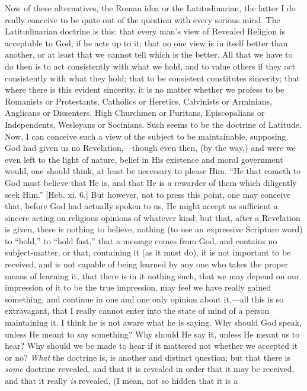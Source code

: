 Now of these alternatives, the Roman idea or the Latitudinarian,
the latter I do really conceive to be quite out of the question with
every serious mind. The Latitudinarian doctrine is this: that every
man's view of Revealed Religion is acceptable to God, if he acts up to
it; that no one view is in itself better than another, or at least
that we cannot tell which is the better. All that we have to do then
is to act consistently with what we hold, and to value others if they
act consistently with what they hold; that to be consistent
constitutes sincerity; that where there is this evident sincerity, it
is no matter whether we profess to be Romanists or Protestants,
Catholics or Heretics, Calvinists or Arminians, Anglicans or
Dissenters, High Churchmen or Puritans, Episcopalians or Independents,
Wesleyans or Socinians. Such seems to be the doctrine of Latitude.
Now, I can conceive such a view of the subject to be maintainable,
supposing God had given us no Revelation,—though even then, (by the
way,) and were we even left to the light of nature, belief in His
existence and moral government would, one should think, at least be
necessary to please Him. ``He that cometh to God must believe that
He is, and that He is a rewarder of them which diligently seek
Him.'' [Heb. xi. 6.] But however, not to press this point, one may
conceive that, before God had actually spoken to us, He might accept
as sufficient a sincere acting on religious opinions of whatever kind;
but that, after a Revelation is given, there is nothing to believe,
nothing (to use an expressive Scripture word) to ``hold,'' to
``hold fast,'' that a message comes from God, and contains no
subject-matter, or that, containing it (as it must do), it is not
important to be received, and is not capable of being learned by any
one who takes the proper means of learning it, that there is in it
nothing such, that we may depend on our impression of it to be the
true impression, may feel we have really gained something, and
continue in one and one only opinion about it,—all this is so
extravagant, that I really cannot enter into the state of mind of a
person maintaining it. I think he is not aware what he is saying. Why
should God speak, unless He meant to say something? Why should He say
it, unless He meant us to hear? Why should we be made to hear if it
mattered not whether we accepted it or no? \emph{What} the doctrine is, is
another and distinct question; but that there is \emph{some} doctrine
revealed, and that it is revealed in order that it may be received,
and that it really \emph{is} revealed, (I mean, not so hidden that it is a

